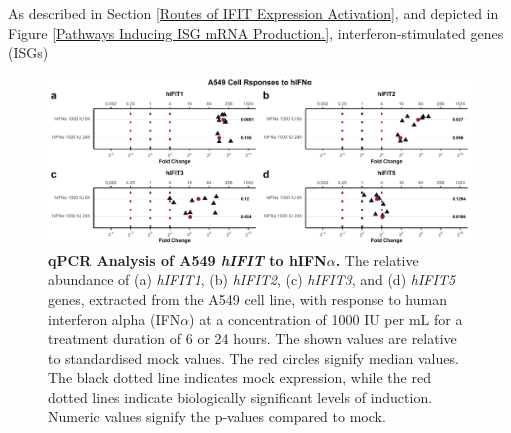 As described in Section \ref{Routes of IFIT Expression Activation}, and depicted in Figure \ref{Pathways Inducing ISG mRNA Production.},  interferon-stimulated genes (ISGs) 


\begin{figure}
    \centering
    \includegraphics[width=1\linewidth]{06. Chapter 1/Figs/01. Induction/01. a549_treat_ifna.pdf}
    \caption[qPCR Analysis of A549 \textit{hIFIT} Response to hIFN\(\alpha\).]{\textbf{qPCR Analysis of A549 \textit{hIFIT} to hIFN\(\alpha\).} The relative abundance of (a) \textit{hIFIT1}, (b) \textit{hIFIT2}, (c) \textit{hIFIT3}, and (d) \textit{hIFIT5} genes, extracted from the A549 cell line, with response to human interferon alpha (IFN\(\alpha\)) at a concentration of 1000 IU per mL for a treatment duration of 6 or 24 hours. The shown values are relative to standardised mock values. The red circles signify median values. The black dotted line indicates mock expression, while the red dotted lines indicate biologically significant levels of induction. Numeric values signify the p-values compared to mock.}
    \label{A549 Response to hIFNa}
\end{figure}


